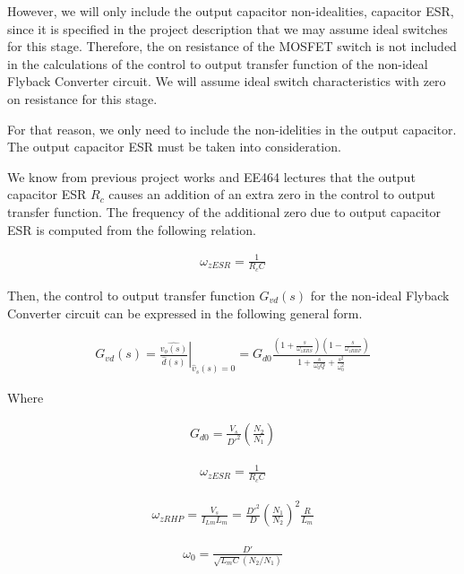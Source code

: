 However, we will only include the output capacitor non-idealities, capacitor ESR, since it is specified in the project description that we may assume ideal switches for this stage. Therefore, the on resistance of the MOSFET switch is not included in the calculations of the control to output transfer function of the non-ideal Flyback Converter circuit. We will assume ideal switch characteristics with zero on resistance for this stage.

For that reason, we only need to include the non-idelities in the output capacitor. The output capacitor ESR must be taken into consideration.

We know from previous project works and EE464 lectures that the output capacitor ESR $R_c$ causes an addition of an extra zero in the control to output transfer function. The frequency of the additional zero due to output capacitor ESR is computed from the following relation.

\begin{align}
    \omega_{zESR} = \frac{1}{R_cC}
\end{align}

Then, the control to output transfer function $G_{vd}(s)$ for the non-ideal Flyback Converter circuit can be expressed in the following general form.

\begin{align}
   \left. G_{vd}(s) = \frac{\hat{v_o(s)}}{\hat{d}(s)}\right \vert_{\hat{v}_s(s) = 0} = G_{d0}\frac{\left(1+\frac{s}{\omega_{zERS}}\right)\left(1-\frac{s}{\omega_{zRHP}} \right)}{1+\frac{s}{\omega_0 Q}+\frac{s^2}{\omega_0^2}}
   \label{com:non_ideal_tf}
\end{align}

Where

\begin{align}
    G_{d0} = \frac{V_s}{D'^2}\left(\frac{N_2}{N_1} \right)
\end{align}

\begin{align}
    \omega_{zESR} = \frac{1}{R_cC}
\end{align}

\begin{align}
    \omega_{zRHP} = \frac{V_s}{I_{Lm}L_m} = \frac{D'^2}{D}\left(\frac{N_1}{N_2} \right)^2\frac{R}{L_m}
\end{align}

\begin{align}
    \omega_0 = \frac{D'}{\sqrt{L_mC}(N_2/N_1)}
\end{align}

